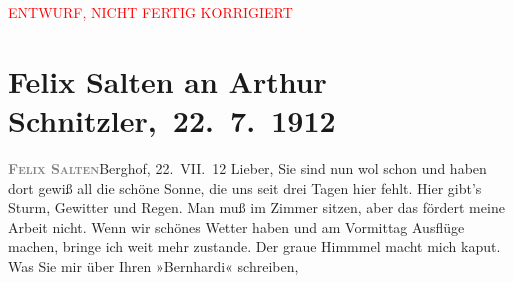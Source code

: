 
\begin{center}
            \textcolor{red}{ENTWURF, NICHT FERTIG KORRIGIERT}
                      \end{center}
            
         
         \renewcommand{\erwaehntePersonen}{Personen: Lili Cappellini, Samuel Fischer, Hedwig Fischer, Karl Goldmark, Olga Schnitzler, Heinrich Schnitzler}
         \renewcommand{\erwaehnteInstitutionen}{Institutionen: K. u. k. Zensurstelle}
         \renewcommand{\erwaehnteOrte}{Orte: Berghof, Brijuni, Unterach am Attersee}
         \renewcommand{\erwaehnteWerke}{Werke: Professor Bernhardi. Komödie in fünf Akten}
               \section[ Felix Salten an Arthur Schnitzler, 22. 7. 1912]{ Felix Salten an Arthur Schnitzler, 22. 7. 1912}\nopagebreak{}\rehead{ }\begin{ledgroupsized}[t]{13cm}\normalsize\beginnumbering \toendnotes[C]{\smallbreak\pagebreak[2]} 
\toendnotes[C]{\smallbreak}\pstart
           \noindent{}{\pb}\textcolor{gray}{\textbf{\textsc{Felix Salten}}}\hfill Berghof, 22. VII. 12\pend
           \pstart{}Lieber,\pend\pstart
           Sie sind nun wol schon \label{K_L03558-1v}\label{K_L03558-1h} und haben dort gewiß all die schöne Sonne, die uns seit drei Tagen hier fehlt. Hier gibt’s Sturm,
               Gewitter und Regen. Man muß im Zimmer sitzen, aber das fördert meine Arbeit nicht.
               Wenn wir schönes Wetter haben und am Vormittag Ausflüge machen, bringe ich weit mehr
               zustande. Der graue Himmmel macht mich kaput.\pend
           \pstart
           Was Sie mir über Ihren »Bernhardi« schreiben,

\end{ledgroupsized}
